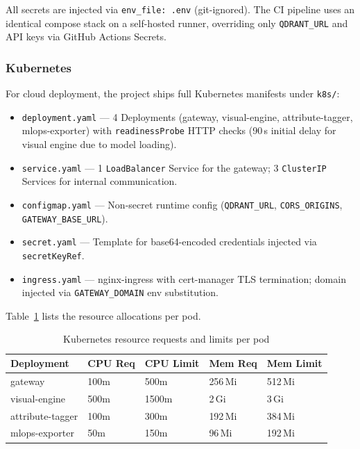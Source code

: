 \documentclass[12pt]{article}
\begin{document}
All secrets are injected via \texttt{env\_file: .env} (git-ignored). The CI pipeline uses an identical compose stack on a self-hosted runner, overriding only \texttt{QDRANT\_URL} and API keys via GitHub Actions Secrets.

\subsubsection{Kubernetes}

For cloud deployment, the project ships full Kubernetes manifests under \texttt{k8s/}:

\begin{itemize}[leftmargin=*]
  \item \texttt{deployment.yaml} --- 4 Deployments (gateway, visual-engine, attribute-tagger, mlops-exporter) with \texttt{readinessProbe} HTTP checks (90\,s initial delay for visual engine due to model loading).
  \item \texttt{service.yaml} --- 1 \texttt{LoadBalancer} Service for the gateway; 3 \texttt{ClusterIP} Services for internal communication.
  \item \texttt{configmap.yaml} --- Non-secret runtime config (\texttt{QDRANT\_URL}, \texttt{CORS\_ORIGINS}, \texttt{GATEWAY\_BASE\_URL}).
  \item \texttt{secret.yaml} --- Template for base64-encoded credentials injected via \texttt{secretKeyRef}.
  \item \texttt{ingress.yaml} --- nginx-ingress with cert-manager TLS termination; domain injected via \texttt{GATEWAY\_DOMAIN} env substitution.
\end{itemize}

Table~\ref{tab:k8s-resources} lists the resource allocations per pod.

\begin{table}[H]
\centering
\small
\begin{tabular}{@{}lllll@{}}
\toprule
\textbf{Deployment} & \textbf{CPU Req} & \textbf{CPU Limit} & \textbf{Mem Req} & \textbf{Mem Limit} \\ \midrule
gateway           & 100m  & 500m   & 256\,Mi & 512\,Mi \\
visual-engine     & 500m  & 1500m  & 2\,Gi   & 3\,Gi \\
attribute-tagger  & 100m  & 300m   & 192\,Mi & 384\,Mi \\
mlops-exporter    & 50m   & 150m   & 96\,Mi  & 192\,Mi \\ \bottomrule
\end{tabular}
\caption{Kubernetes resource requests and limits per pod}
\label{tab:k8s-resources}
\end{table}
\end{document}

